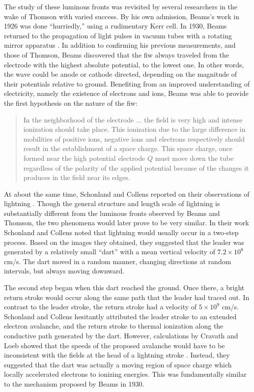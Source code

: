 The study of these luminous fronts was revisited by several researchers in the
wake of Thomson \cite{James1904, Whiddington1925, Beams1926} with varied
success. By his own admission, Beams's work in 1926 was done ``hurriedly,''
using a rudimentary Kerr cell. In 1930, Beams returned to the propagation of
light pulses in vacuum tubes with a rotating mirror apparatus \cite{Beams1930}.
In addition to confirming his previous measurements, and those of Thomson, Beams
discovered that the \acs{fiw} always traveled from the electrode with the
highest absolute potential, to the lowest one. In other words, the wave could be
anode or cathode directed, depending on the magnitude of their potentials
relative to ground. Benefiting from an improved understanding of electricity,
namely the existence of electrons and ions, Beams was able to provide the first
hypothesis on the nature of the \acs{fiw}:
\begin{quote}
  In the neighborhood of the electrode $\ldots{}$ the field is very high and
  intense ionization should take place. This ionization due to the large
  difference in mobilities of positive ions, negative ions and electrons
  respectively should result in the establishment of a space charge. This space
  charge, once formed near the high potential electrode $Q$ must move down the
  tube regardless of the polarity of the applied potential because of the
  changes it produces in the field near its edges.
\end{quote}

At about the same time, Schonland and Collens reported on their observations of
lightning \cite{Schonland1933}. Though the general structure and length scale of
lightning is substantially different from the luminous fronts observed by Beams
and Thomson, the two phenomena would later prove to be very similar. In their
work Schonland and Collens noted that lightning would usually occur in a
two-step process. Based on the images they obtained, they suggested that
the leader was generated by a relatively small ``dart'' with a mean vertical
velocity of $7.2\times10^8$ cm/s. The dart moved in a random manner, changing
directions at random intervals, but always moving downward.

The second step began when this dart reached the ground. Once there, a bright
return stroke would occur along the same path that the leader had traced out. In
contrast to the leader stroke, the return stroke had a velocity of $5\times10^9$
cm/s. Schonland and Collens hesitantly attributed the leader stroke to an
extended electron avalanche, and the return stroke to thermal ionization along
the conductive path generated by the dart. However, calculations by Cravath and
Loeb showed that the speeds of the proposed avalanche would have to be
inconsistent with the fields at the head of a lightning stroke
\cite{Cravath1935}. Instead, they suggested that the dart was actually a moving
region of space charge which locally accelerated electrons to ionizing energies.
This was fundamentally similar to the mechanism proposed by Beams in 1930.

